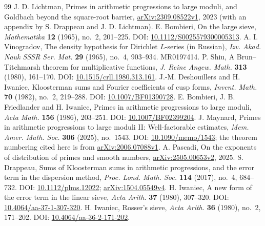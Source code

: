 \documentclass{amsart}
\numberwithin{equation}{section}
\theoremstyle{definition}
\theoremstyle{plain}
\begin{document}
\begin{thebibliography}{99}
 J. D. Lichtman,
Primes in arithmetic progressions to large moduli, and Goldbach beyond
the square-root barrier,
\href{https://arxiv.org/abs/2309.08522v1}{arXiv:2309.08522v1}, 2023
(with an appendix by S. Drappeau and J. D. Lichtman).
 E. Bombieri, On the large sieve,
\emph{Mathematika} \textbf{12} (1965), no.~2, 201--225.
DOI: \href{https://doi.org/10.1112/S0025579300005313}{10.1112/S0025579300005313}.
 A. I. Vinogradov,
The density hypothesis for Dirichlet $L$-series (in Russian),
\emph{Izv. Akad. Nauk SSSR Ser. Mat.} \textbf{29} (1965), no.~4,
903--934.
MR0197414.
 P. Shiu,
A Brun--Titchmarsh theorem for multiplicative functions,
\emph{J. Reine Angew. Math.} \textbf{313} (1980), 161--170.
DOI: \href{https://doi.org/10.1515/crll.1980.313.161}{10.1515/crll.1980.313.161}.
 J.-M. Deshouillers and H. Iwaniec,
Kloosterman sums and Fourier coefficients of cusp forms,
\emph{Invent. Math.} \textbf{70} (1982), no.~2, 219--288.
DOI: \href{https://doi.org/10.1007/BF01390728}{10.1007/BF01390728}.
 E. Bombieri, J. B. Friedlander and H. Iwaniec,
Primes in arithmetic progressions to large moduli,
\emph{Acta Math.} \textbf{156} (1986), 203--251.
DOI: \href{https://doi.org/10.1007/BF02399204}{10.1007/BF02399204}.
 J. Maynard,
Primes in arithmetic progressions to large moduli II: Well-factorable estimates,
\emph{Mem. Amer. Math. Soc.} \textbf{306} (2025), no.~1543.
DOI: \href{https://doi.org/10.1090/memo/1543}{10.1090/memo/1543};
the theorem numbering cited here is from
\href{https://arxiv.org/abs/2006.07088v1}{arXiv:2006.07088v1}.
 A. Pascadi,
On the exponents of distribution of primes and smooth numbers,
\href{https://arxiv.org/abs/2505.00653v2}{arXiv:2505.00653v2}, 2025.
 S. Drappeau,
Sums of Kloosterman sums in arithmetic progressions, and the error term
in the dispersion method,
\emph{Proc. Lond. Math. Soc.} \textbf{114} (2017), no.~4, 684--732.
DOI: \href{https://doi.org/10.1112/plms.12022}{10.1112/plms.12022};
\href{https://arxiv.org/abs/1504.05549v4}{arXiv:1504.05549v4}.
 H. Iwaniec, A new form of the error term in the linear sieve,
\emph{Acta Arith.} \textbf{37} (1980), 307--320.
DOI: \href{https://doi.org/10.4064/aa-37-1-307-320}{10.4064/aa-37-1-307-320}.
 H. Iwaniec, Rosser's sieve,
\emph{Acta Arith.} \textbf{36} (1980), no.~2, 171--202.
DOI: \href{https://doi.org/10.4064/aa-36-2-171-202}{10.4064/aa-36-2-171-202}.

\end{thebibliography}
\end{document}
